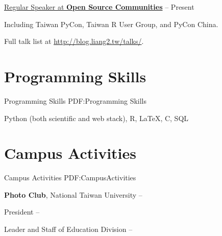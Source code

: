 \documentclass[a4paper,10pt,oneside]{article}
\begin{document}
\begin{body}
\EntryGap
\href{http://blog.liang2.tw/talks/#talks}{Regular Speaker at \textbf{Open Source Communities}}
\hfill
{} --
Present
\begin{detail}
    \begin{detailitem}
    \item Including Taiwan PyCon, Taiwan R User Group, and PyCon China.
    \item Full talk list at \href{http://blog.liang2.tw/talks/#talks}{http://blog.liang2.tw/talks/}.
    \end{detailitem}
\end{detail}


\section
{Programming Skills}
{Programming Skills}
{PDF:Programming Skills}

Python (both scientific and web stack),
R,
\LaTeX,
C, SQL


\section
{Campus Activities}
{Campus Activities}
{PDF:CampusActivities}

\textbf{Photo Club},
National Taiwan University
\hfill
{} --

President
\hfill
{} --

Leader and Staff of Education Division
\hfill
{} --


\end{body}
\end{document}
